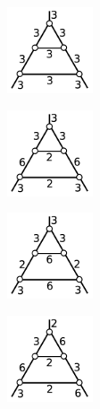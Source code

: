 \documentclass[suppldata, dvipdfmx]{interact}
\theoremstyle{plain}%
\theoremstyle{definition}
\theoremstyle{remark}
\theoremstyle{problemstyle}
\begin{document}
\begin{figure}[h!tbp]
  \begin{minipage}[t]{0.23\textwidth}
   \centering
   \includegraphics[width=1in,
   keepaspectratio]{./img/HexahedraWithSphericalFaces/pentahedralPrism/a.jpg}
   \label{fig:pentahedralPrismType1}
  \end{minipage}
  \hspace*{\fill}
  \begin{minipage}[t]{0.23\textwidth}
   \centering
   \includegraphics[width=1in, keepaspectratio]{./img/HexahedraWithSphericalFaces/pentahedralPrism/b.jpg}
   \label{fig:pentahedralPrismType2}
  \end{minipage}
 \hspace*{\fill}
  \begin{minipage}[t]{0.23\textwidth}
   \centering
   \includegraphics[width=1in, keepaspectratio]{./img/HexahedraWithSphericalFaces/pentahedralPrism/c.jpg}
   \label{fig:pentahedralPrismType3}
  \end{minipage}
 \hspace*{\fill}
  \begin{minipage}[t]{0.23\textwidth}
   \centering
   \includegraphics[width=1in, keepaspectratio]{./img/HexahedraWithSphericalFaces/pentahedralPrism/d.jpg}
   \label{fig:pentahedralPrismType4}

\end{minipage}
\end{figure}
\end{document}

